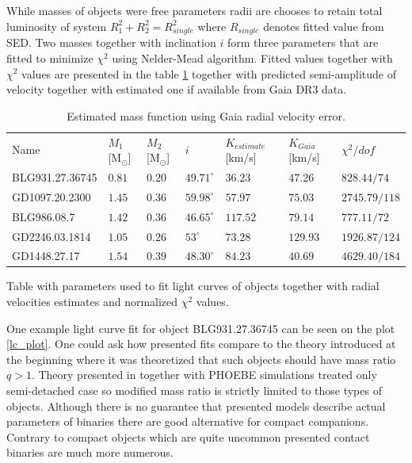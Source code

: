 \documentclass{pracalicmgr}
\begin{document}
While masses of objects were free parameters radii are chooses to retain total luminosity of system $R_1^2+R_2^2=R_{single}^2$ where $R_{single}$ denotes 
fitted value from SED. Two masses together with inclination $i$ form three parameters that are fitted to minimize $\chi^2$ using Nelder-Mead algorithm.
Fitted values together with $\chi^2$ values are presented in the table \ref{light_curve_fits} together with predicted semi-amplitude of velocity together 
with estimated one if available from Gaia DR3 data.
\begin{table}[H]
    \normalsize
    \begin{center}
    \begin{tabular}{lllllll}
    Name & $M_1$ [M$_{\odot}$] & $M_2$ [M$_{\odot}$] & $i$ & $K_{estimate}$ [km/s] & $K_{Gaia}$ [km/s]&$\chi^2/dof$ \\
    BLG931.27.36745 & $0.81$ & $0.20$ & $49.71^\circ$ & $36.23$ & $47.26$ & $828.44/74$ \\
    GD1097.20.2300 & $1.45$ & $0.36$ & $59.98^\circ$ &$57.97$& $75.03$ & $2745.79/118$ \\
    BLG986.08.7 & $1.42$ & $0.36$ & $46.65^\circ$ & $117.52$ & $79.14$ & $777.11/72$ \\
    GD2246.03.1814 & $1.05$ & $0.26$ & $53^\circ$ & $73.28$ & $129.93$ & $1926.87/124$\\
    GD1448.27.17 & $1.54$ & $0.39$ & $48.30^\circ$ & $84.23$ & $40.69$ & $4629.40/184$\\
    \end{tabular}
    \caption{Table with parameters used to fit light curves of objects together with radial velocities estimates and 
    normalized $\chi^2$ values.}
    \end{center}
    
    \caption{Estimated mass function using Gaia radial velocity error.}\label{light_curve_fits}
\end{table}
One example light curve fit for object BLG931.27.36745 can be seen on the plot \ref{lc_plot}.
One could ask how presented fits compare to the theory introduced at the beginning where it was theoretized that 
such objects should have mass ratio $q>1$. Theory presented in \citep{gomel_search_2021} together with PHOEBE simulations treated only semi-detached case
so modified mass ratio is strictly limited to those types of objects. Although there is no guarantee that presented models
describe actual parameters of binaries there are good alternative for compact companions. Contrary to compact objects 
which are quite uncommon presented contact binaries are much more numerous.
\end{document}

